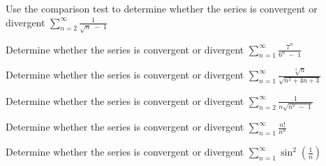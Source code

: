 \documentclass[
  course = {{MATH102 Calculus II}},
  quartile = {{2}},
  assignment = 21,%
  topic = {{11.4: The Comparison Tests}},
  firstexercise = 1,
  term = 202
]{aga-homework}
\begin{document}
\newpage

\problem Use the comparison test to determine whether the series is convergent or divergent
$\displaystyle \sum_{n=2}^{\infty}\frac{1}{\sqrt{n}\;-\;1}$

\newpage

\problem Determine whether the series is convergent or divergent
$\displaystyle \sum_{n=1}^{\infty}\frac{7^n}{6^n\;-\;1}$

\newpage

\problem Determine whether the series is convergent or divergent
$\displaystyle \sum_{n=1}^{\infty}\frac{\sqrt[3]{n}}{\sqrt{n^3+4n+3}}$

\newpage

\problem Determine whether the series is convergent or divergent
$\displaystyle \sum_{n=2}^{\infty}\frac{1}{n\sqrt{n^2\;-\;1}}$

\newpage

\problem Determine whether the series is convergent or divergent
$\displaystyle \sum_{n=1}^{\infty}\frac{n!}{n^n}$

\newpage

\problem Determine whether the series is convergent or divergent
$\displaystyle \sum_{n=1}^{\infty}\sin^2\left(\frac{1}{n}\right)$

\newpage
\afterpage{\null\newpage}

\afterpage{\null\newpage}

\afterpage{\null\newpage}
\end{document}
